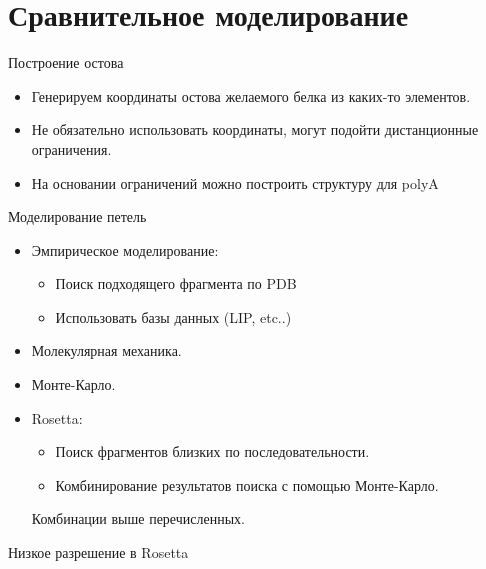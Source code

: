 \section{Сравнительное моделирование}
\begin{frame}{Построение остова}

\begin{itemize}
	\item
Генерируем координаты остова желаемого белка из  каких-то элементов.
\item
Не обязательно использовать координаты, могут подойти дистанционные ограничения.
\item
На основании ограничений можно  построить структуру для polyA
\end{itemize}
\end{frame}
\begin{frame}{Моделирование петель}

	\begin{itemize}
		\item
			Эмпирическое моделирование:
			\begin{itemize}
				\item
					Поиск подходящего фрагмента по PDB 
				\item
					Использовать базы данных (LIP, etc..)
			\end{itemize}
 		         \item
					 Молекулярная механика.
				 \item
					 Монте-Карло.
				 \item
					 Rosetta:
					 \begin{itemize}
						 \item
			 Поиск фрагментов близких по последовательности.
						 \item
			 Комбинирование результатов поиска с помощью Монте-Карло.
					 \end{itemize}
					 \vspace{1.0cm}
		  Комбинации выше перечисленных.
	\end{itemize}
\end{frame}

\begin{frame}{Низкое разрешение в Rosetta}
  \centering       
\end{frame}

